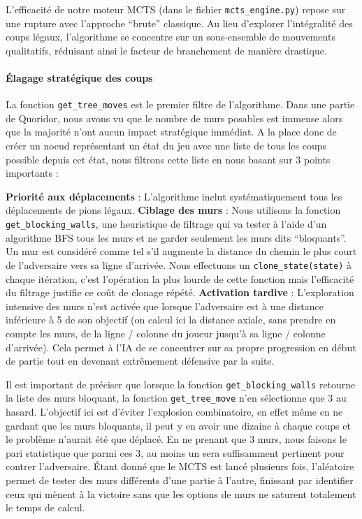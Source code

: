 \documentclass[a4paper]{article}
\begin{document}
L’efficacité de notre moteur MCTS (dans le fichier \texttt{mcts\_engine.py}) repose sur une rupture avec l’approche “brute” classique. 
Au lieu d’explorer l’intégralité des coups légaux, l’algorithme se concentre sur un sous-ensemble de mouvements qualitatifs, 
réduisant ainsi le facteur de branchement de manière drastique.

\paragraph{Élagage stratégique des coups} La fonction \texttt{get\_tree\_moves} est le premier filtre de l’algorithme. 
Dans une partie de Quoridor, nous avons vu que le nombre de murs posables est immense alors que la majorité n’ont aucun impact 
stratégique immédiat. A la place donc de créer un noeud représentant un état du jeu avec une liste de tous les coups possible 
depuis cet état, nous filtrons cette liste en nous basant sur 3 points importants : 

\bigskip


\textbf{Priorité aux déplacements} : L’algorithme inclut systématiquement tous les déplacements de pions légaux.
\newline
\textbf{Ciblage des murs} : Nous utilisons la fonction \texttt{get\_blocking\_walls}, une heuristique de filtrage qui va tester à l’aide d’un algorithme BFS tous les murs et ne garder seulement les murs dits “bloquants”. Un mur est considéré comme tel s’il augmente la distance du chemin le plus court de l’adversaire vers sa ligne d'arrivée. Nous effectuons un \texttt{clone\_state(state)} à chaque itération, c’est l’opération la plus lourde de cette fonction mais l’efficacité du filtrage justifie ce coût de clonage répété.
\newline
\textbf{Activation tardive} : L’exploration intensive des murs n’est activée que lorsque l’adversaire est à une distance inférieure à 5 de son objectif (on calcul ici la distance axiale, sans prendre en compte les murs, de la ligne / colonne du joueur jusqu’à sa ligne / colonne d’arrivée). Cela permet à l’IA de se concentrer sur sa propre progression en début de partie tout en devenant extrêmement défensive par la suite.



\bigskip

Il est important de préciser que lorsque la fonction \texttt{get\_blocking\_walls} retourne la liste des murs bloquant, 
la fonction \texttt{get\_tree\_move} n’en sélectionne que 3 au hasard. L’objectif ici est d’éviter l’explosion combinatoire, 
en effet même en ne gardant que les murs bloquants, il peut y en avoir une dizaine à chaque coups et le problème n’aurait été que 
déplacé. En ne prenant que 3 murs, nous faisons le pari statistique que parmi ces 3, au moins un sera suffisamment pertinent pour contrer 
l’adversaire. Étant donné que le MCTS est lancé plusieurs fois, l’aléatoire permet de tester des murs différents d’une partie à l’autre, 
finissant par identifier ceux qui mènent à la victoire sans que les options de murs ne saturent totalement le temps de calcul.
\end{document}
